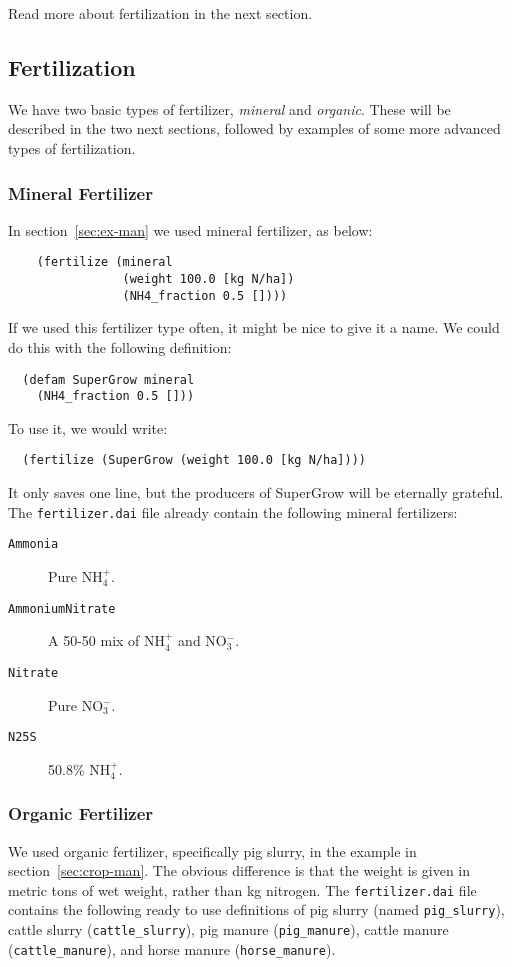 \documentclass[a4paper,11pt]{article}
\begin{document}
Read more about fertilization in the next section.

\subsection{Fertilization}
\label{sec:fertilizer}

We have two basic types of fertilizer, \emph{mineral} and
\emph{organic}.  These will be described in the two next sections,
followed by examples of some more advanced types of fertilization. 

\subsubsection{Mineral Fertilizer}

In section~\ref{sec:ex-man} we used mineral fertilizer, as below:
\begin{verbatim}
    (fertilize (mineral
                (weight 100.0 [kg N/ha])
                (NH4_fraction 0.5 [])))
\end{verbatim}
If we used this fertilizer type often, it might be nice to give it a
name.  We could do this with the following definition:
\begin{verbatim}
  (defam SuperGrow mineral
    (NH4_fraction 0.5 []))
\end{verbatim}
To use it, we would write:
\begin{verbatim}
  (fertilize (SuperGrow (weight 100.0 [kg N/ha])))
\end{verbatim}
It only saves one line, but the producers of SuperGrow\texttrademark{}
will be eternally grateful.  The \texttt{fertilizer.dai} file already
contain the following mineral fertilizers:
\begin{description}
\item[\texttt{Ammonia}] Pure NH$_4^+$.
\item[\texttt{AmmoniumNitrate}] A 50-50 mix of NH$_4^+$ and NO$_3^-$.
\item[\texttt{Nitrate}] Pure NO$_3^-$.
\item[\texttt{N25S}] 50.8\% NH$_4^+$.
\end{description}

\subsubsection{Organic Fertilizer}

We used organic fertilizer, specifically pig slurry, in the example in
section~\ref{sec:crop-man}.  The obvious difference is that the weight
is given in metric tons of wet weight, rather than kg nitrogen.  The
\texttt{fertilizer.dai} file contains the following ready to use
definitions of pig slurry (named \texttt{pig\_slurry}), cattle slurry
(\texttt{cattle\_slurry}), pig manure (\texttt{pig\_manure}), cattle
manure (\texttt{cattle\_manure}), and horse manure
(\texttt{horse\_manure}).
\end{document}

